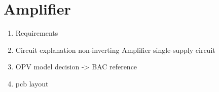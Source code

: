 \section{Amplifier}

\begin{enumerate}
  \item Requirements
  \item Circuit explanation
  \subitem non-inverting Amplifier
  \subitem single-supply circuit
  \item OPV model decision -> BAC reference
  \item pcb layout
\end{enumerate}